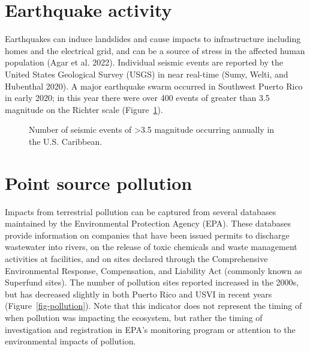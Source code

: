 \documentclass[
  letterpaper,
  oneside,
  open=any]{scrbook}
\begin{document}
\section{Earthquake activity}\label{earthquake-activity}

Earthquakes can induce landslides and cause impacts to infrastructure
including homes and the electrical grid, and can be a source of stress
in the affected human population (Agar et al. 2022). Individual seismic
events are reported by the United States Geological Survey (USGS) in
near real-time (Sumy, Welti, and Hubenthal 2020). A major earthquake
swarm occurred in Southwest Puerto Rico in early 2020; in this year
there were over 400 events of greater than 3.5 magnitude on the Richter
scale (Figure~\ref{fig-quakes}).

\begin{figure}


\caption{\label{fig-quakes}Number of seismic events of \textgreater3.5
magnitude occurring annually in the U.S. Caribbean.}

\end{figure}%

\section{Point source pollution}\label{point-source-pollution}

Impacts from terrestrial pollution can be captured from several
databases maintained by the Environmental Protection Agency (EPA). These
databases provide information on companies that have been issued permits
to discharge wastewater into rivers, on the release of toxic chemicals
and waste management activities at facilities, and on sites declared
through the Comprehensive Environmental Response, Compensation, and
Liability Act (commonly known as Superfund sites). The number of
pollution sites reported increased in the 2000s, but has decreased
slightly in both Puerto Rico and USVI in recent years
(Figure~\ref{fig-pollution}). Note that this indicator does not
represent the timing of when pollution was impacting the ecosystem, but
rather the timing of investigation and registration in EPA's monitoring
program or attention to the environmental impacts of pollution.
\end{document}
